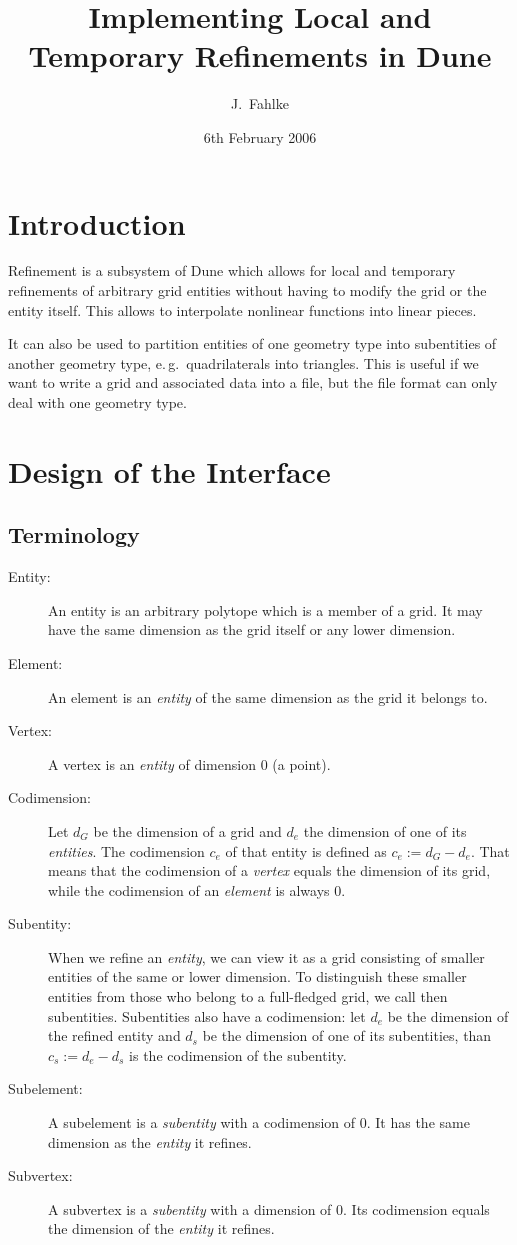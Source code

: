 \documentclass[english,a4paper]{article}
\author{J.~Fahlke}
\title{Implementing Local and Temporary Refinements in Dune}
\date{6th February 2006}
\begin{document}
\maketitle

\section{Introduction}

Refinement is a subsystem of Dune\cite{dune} which allows for local
and temporary refinements of arbitrary grid entities without having to
modify the grid or the entity itself.  This allows to interpolate
nonlinear functions into linear pieces.

It can also be used to partition entities of one geometry type into
subentities of another geometry type, e.\,g.\ quadrilaterals into
triangles.  This is useful if we want to write a grid and associated
data into a file, but the file format can only deal with one geometry
type.

\section{Design of the Interface}

\subsection{Terminology}

\begin{description}
\item[Entity:] An entity is an arbitrary polytope which is a member of
  a grid.  It may have the same dimension as the grid itself or any
  lower dimension.
\item[Element:] An element is an {\em entity} of the same dimension as
  the grid it belongs to.
\item[Vertex:] A vertex is an {\em entity} of dimension 0 (a point).
\item[Codimension:] Let $d_G$ be the dimension of a grid and $d_e$ the
  dimension of one of its {\em entities}.  The codimension $c_e$ of that
  entity is defined as $c_e:=d_G-d_e$.  That means that the
  codimension of a {\em vertex} equals the dimension of its grid,
  while the codimension of an {\em element} is always 0.
\item[Subentity:] When we refine an {\em entity}, we can view it as a
  grid consisting of smaller entities of the same or lower dimension.
  To distinguish these smaller entities from those who belong to a
  full-fledged grid, we call then subentities.  Subentities also have
  a codimension: let $d_e$ be the dimension of the refined entity and
  $d_s$ be the dimension of one of its subentities, than $c_s:=d_e-d_s$
  is the codimension of the subentity.
\item[Subelement:] A subelement is a {\em subentity} with a
  codimension of 0.  It has the same dimension as the {\em entity} it
  refines.
\item[Subvertex:] A subvertex is a {\em subentity} with a dimension of
  0.  Its codimension equals the dimension of the {\em entity} it
  refines.
\end{description}
\end{document}
